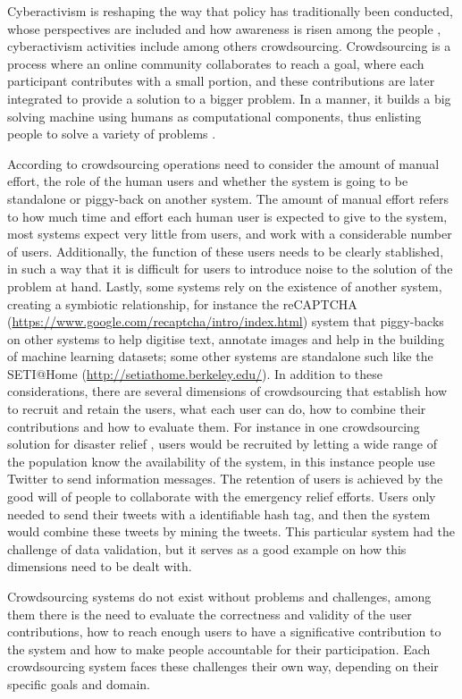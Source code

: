 \documentclass[letterpaper,10pt]{article}
\begin{document}
Cyberactivism is reshaping the way that policy has traditionally been conducted, whose perspectives are included and how awareness is risen among the people \citep{milan2013}, cyberactivism activities include among others crowdsourcing. Crowdsourcing is a process where an online community collaborates to reach a goal, where each participant contributes with a small portion, and these contributions are later integrated to provide a solution to a bigger problem. In a manner, it builds a big solving machine using humans as computational components, thus enlisting people to solve a variety of problems \citep{doan2011}.

According to \cite{doan2011} crowdsourcing operations need to consider the amount of manual effort, the role of the human users and whether the system is going to be standalone or piggy-back on another system. The amount of manual effort refers to how much time and effort each human user is expected to give to the system, most systems expect very little from users, and work with a considerable number of users. Additionally, the function of these users needs to be clearly stablished, in such a way that it is difficult for users to introduce noise to the solution of the problem at hand. Lastly, some systems rely on the existence of another system, creating a symbiotic relationship, for instance the reCAPTCHA (\url{https://www.google.com/recaptcha/intro/index.html}) system that piggy-backs on other systems to help digitise text, annotate images and help in the building of machine learning datasets; some other systems are standalone such like the SETI@Home (\url{http://setiathome.berkeley.edu/}). In addition to these considerations, there are several dimensions of crowdsourcing that establish how to recruit and retain the users, what each user can do, how to combine their contributions and how to evaluate them. For instance in one crowdsourcing solution for disaster relief \citep{gao2011}, users would be recruited by letting a wide range of the population know the availability of the system, in this instance people use Twitter to send information messages. The retention of users is achieved by the good will of people to collaborate with the emergency relief efforts. Users only needed to send their tweets with a identifiable hash tag, and then the system would combine these tweets by mining the tweets. This particular system had the challenge of data validation, but it serves as a good example on how this dimensions need to be dealt with.

Crowdsourcing systems do not exist without problems and challenges, among them there is the need to evaluate the correctness and validity of the user contributions, how to reach enough users to have a significative contribution to the system and how to make people accountable for their participation. Each crowdsourcing system faces these challenges their own way, depending on their specific goals and domain.
\end{document}
